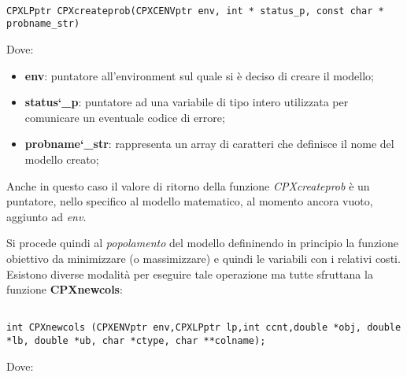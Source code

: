 \documentclass[11pt]{article}
\begin{document}
\begin{lstlisting}

CPXLPptr CPXcreateprob(CPXCENVptr env, int * status_p, const char * probname_str)

\end{lstlisting}

Dove:

\begin{itemize}
    \item \textbf{env}: puntatore all'environment sul quale si è deciso di creare il modello;
    \item \textbf{status\char`\_p}: puntatore ad una variabile di tipo intero utilizzata per comunicare un eventuale codice di errore;
    \item \textbf{probname\char`\_str}: rappresenta un array di caratteri che definisce il nome del modello creato;
\end{itemize}

Anche in questo caso il valore di ritorno della funzione \textit{CPXcreateprob} è un puntatore, nello specifico al modello matematico, al momento ancora vuoto, aggiunto ad \textit{env}.

Si procede quindi al \textit{popolamento} del modello defininendo in principio la funzione obiettivo da minimizzare (o massimizzare) e quindi le variabili con i relativi costi. Esistono diverse modalità per eseguire tale operazione ma tutte sfruttana la funzione \textbf{CPXnewcols}:

\begin{lstlisting}

int CPXnewcols (CPXENVptr env,CPXLPptr lp,int ccnt,double *obj, double *lb, double *ub, char *ctype, char **colname);

\end{lstlisting}

Dove:
\end{document}
